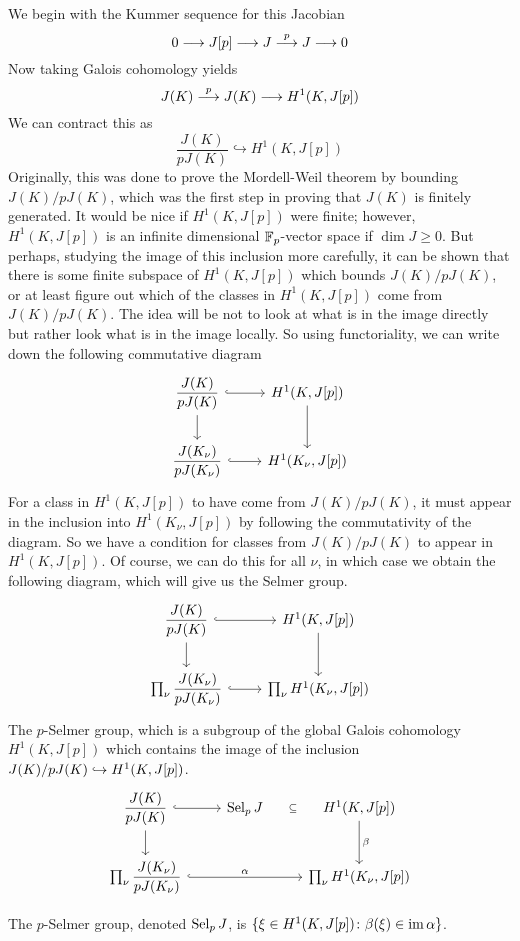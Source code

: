 We begin with the Kummer sequence for this Jacobian
	\[
	0 \stackrel{}{\longrightarrow} J[p] \stackrel{}{\longrightarrow} J \stackrel{p}{\longrightarrow} J \stackrel{}{\longrightarrow} 0
	\]
Now taking Galois cohomology yields
	\[
	J(K) \stackrel{p}{\longrightarrow} J(K) \stackrel{}{\longrightarrow} H^1(K, J[p])
	\]
We can contract this as
	\[
	\dfrac{J(K)}{pJ(K)} \hookrightarrow H^1(K,J[p])
	\]
Originally, this was done to prove the Mordell-Weil theorem by bounding $J(K)/pJ(K)$, which was the first step in proving that $J(K)$ is finitely generated. It would be nice if $H^1(K,J[p])$ were finite; however, $H^1(K,J[p])$ is an infinite dimensional $\mathbb{F}_p$-vector space if $\dim J \geq 0$. But perhaps, studying the image of this inclusion more carefully, it can be shown that there is some finite subspace of $H^1(K,J[p])$ which bounds $J(K)/pJ(K)$, or at least figure out which of the classes in $H^1(K,J[p])$ come from $J(K)/pJ(K)$. The idea will be not to look at what is in the image directly but rather look what is in the image locally. So using functoriality, we can write down the following commutative diagram  
	\[
	\begin{tikzcd}
	\dfrac{J(K)}{pJ(K)} \arrow[hook]{r} \arrow{d} & H^1(K,J[p]) \arrow{d} \\
	\dfrac{J(K_\nu)}{pJ(K_\nu)} \arrow[hook]{r} & H^1(K_\nu,J[p])
	\end{tikzcd}
	\]
For a class in $H^1(K,J[p])$ to have come from $J(K)/pJ(K)$, it must appear in the inclusion into $H^1(K_\nu,J[p])$ by following the commutativity of the diagram. So we have a condition for classes from $J(K)/pJ(K)$ to appear in $H^1(K,J[p])$. Of course, we can do this for all $\nu$, in which case we obtain the following diagram, which will give us the Selmer group.
	\[
	\begin{tikzcd}
	\dfrac{J(K)}{pJ(K)} \arrow[hook]{r} \arrow{d} & H^1(K,J[p]) \arrow{d} \\
	\prod_\nu \dfrac{J(K_\nu)}{pJ(K_\nu)} \arrow[hook]{r} & \prod_\nu H^1(K_\nu,J[p])
	\end{tikzcd}
	\]
The $p$-Selmer group, which is a subgroup of the global Galois cohomology $H^1(K,J[p])$ which contains the image of the inclusion $J(K)/pJ(K) \hookrightarrow H^1(K,J[p])$.
	\[
	\begin{tikzcd}
	\dfrac{J(K)}{pJ(K)} \arrow[hook]{r} \arrow{d} & \sel_p J \arrow[draw=none]{r}[sloped,auto=false]{\subseteq} & H^1(K,J[p]) \arrow{d}{\beta} \\
	\prod_\nu \dfrac{J(K_\nu)}{pJ(K_\nu)} \arrow[hook]{rr}{\alpha} & & \prod_\nu H^1(K_\nu,J[p])
	\end{tikzcd}
	\]


\begin{dfn}
The $p$-Selmer group, denoted $\operatorname{Sel}_p J$, is $\{ \xi \in H^1(K,J[p]) \colon \beta(\xi) \in \operatorname{im} \alpha \}$. 
\end{dfn}


